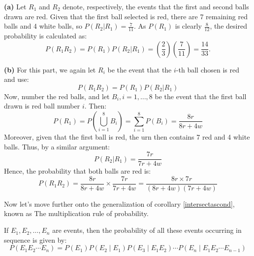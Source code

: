             \begin{solution}
            \textbf{(a)} Let \( R_1 \) and \( R_2 \) denote, respectively, the events that the first and second balls drawn are red. Given that the first ball selected is red, there are 7 remaining red balls and 4 white balls, so \( P(R_2|R_1) = \frac{7}{11} \). As \( P(R_1) \) is clearly \(\frac{8}{12}\), the desired probability is calculated as:
            \[
            P(R_1 R_2) = P(R_1)P(R_2|R_1) = \left(\frac{2}{3}\right)\left(\frac{7}{11}\right) = \frac{14}{33}.
            \]
            
            \textbf{(b)} For this part, we again let \( R_i \) be the event that the \(i\)-th ball chosen is red and use:
            \[
            P(R_1 R_2) = P(R_1)P(R_2|R_1)
            \]
            Now, number the red balls, and let \( B_i, i = 1, \ldots, 8 \) be the event that the first ball drawn is red ball number \( i \). Then:
            \[
            P(R_1) = P\left(\bigcup_{i=1}^8 B_i\right) = \sum_{i=1}^8 P(B_i) = \frac{8r}{8r + 4w}
            \]
            Moreover, given that the first ball is red, the urn then contains 7 red and 4 white balls. Thus, by a similar argument:
            \[
            P(R_2|R_1) = \frac{7r}{7r + 4w}
            \]
            Hence, the probability that both balls are red is:
            \[
            P(R_1 R_2) = \frac{8r}{8r + 4w} \times \frac{7r}{7r + 4w} = \frac{8r \times 7r}{(8r + 4w)(7r + 4w)}
            \]
            \end{solution}
    
        Now let's move further onto the generalization of corollary \ref{intersectascond}, known as The multiplication rule of probability.
        \begin{theorem}
            If \(E_1, E_2, \ldots, E_n\) are events, then the probability of all these events occurring in sequence is given by:
            \[
            P(E_1 E_2 \cdots E_n) = P(E_1) P(E_2 \mid E_1) P(E_3 \mid E_1 E_2) \cdots P(E_n \mid E_1 E_2 \cdots E_{n-1})
            \]
            \end{theorem}
            
